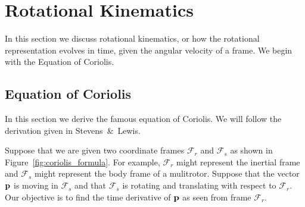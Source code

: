 \section{Rotational Kinematics}
\label{sec:rotational_kinematics}
In this section we discuss rotational kinematics, or how the rotational representation evolves in time, given the angular velocity of a frame.  We begin with the Equation of Coriolis.

\subsection{Equation of Coriolis} \label{sec:nonlinear-coriolis}

In this section we derive the famous
equation of Coriolis.   We will follow the derivation given
in Stevens~\&~Lewis\cite{StevensLewis03}.

Suppose that we are given two coordinate frames $\mathcal{F}_r$ and
$\mathcal{F}_s$ as shown in Figure~\ref{fig:coriolis_formula}.  For
example, $\mathcal{F}_r$ might represent the inertial frame and
$\mathcal{F}_s$ might represent the body frame of a mulitrotor.
Suppose that the vector $\mathbf{p}$ is moving in $\mathcal{F}_s$
and that $\mathcal{F}_s$ is rotating and translating with respect to
$\mathcal{F}_r$.  Our objective is to find the time derivative of
$\mathbf{p}$ as seen from frame $\mathcal{F}_r$.

